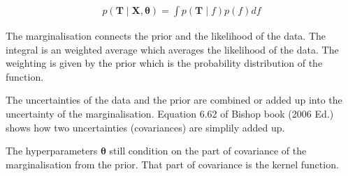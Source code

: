 \documentclass[12pt]{article}
\newenvironment{question}[2][Question]{\begin{trivlist}
\kern10pt
\item[\hskip \labelsep {\bfseries #1}\hskip \labelsep {\bfseries #2.}]}{\end{trivlist}}
\begin{document}
\begin{question}{8}
\begin{align*}
  p(\mathbf{T} \mid \mathbf{X}, \bm{\theta}) = \int p(\mathbf{T}\mid f)p(f) df
\end{align*}

The marginalisation connects the prior and the likelihood of the data. The
 integral is an weighted average which averages the likelihood of the data.
 The weighting is given by the prior which is the probability distribution of
 the function.

The uncertainties of the data and the prior are combined or added up into the 
 uncertainty of the marginalisation. Equation 6.62 of Bishop book (2006 Ed.) shows
 how two uncertainties (covariances) are simplily added up.

The hyperparameters $\bm{\theta}$ still condition on the part of covariance of the 
 marginalisation from the prior. That part of covariance is the kernel function.
\end{question}
\end{document}

